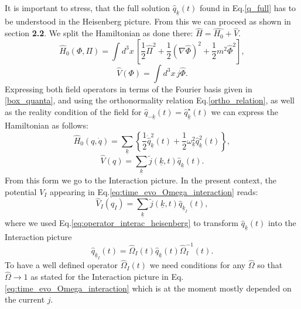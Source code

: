 \documentclass[12pt, titlepage]{article}
\begin{document}
It is important to stress, that the full solution $  \hat{q}_{\underline{k}}(t) 
 $ found in Eq.\enskip\eqref{q_full} has to be understood in the Heisenberg picture.
 From this we can proceed as shown in section \textbf{2.2}.  
We split the Hamiltonian as done there: $ \hat{H}= \hat{H_0} +\hat{V} $. 
\begin{equation}
\hat{H}_{0}({\Phi},{\Pi})=
\int d^{3}x 
\,
\left[ 
\frac{1}{2}\hat{\Pi}^{2} + \frac{1}{2}(\nabla \hat{ \Phi})^{2} 
+\frac{1}{2}m^{2}\hat{\Phi}^{2}
\right] 
,
\end{equation}
\begin{equation}
\hat{V}(\Phi)=
\int d^{3}x 
\,
j\hat{\Phi}
.
\end{equation}
Expressing both field operators in terms of the Fourier basis given in \eqref{box_quanta}, and using the orthonormality relation Eq.\enskip\eqref{ortho_relation}, as well as the reality condition of the field for $ \hat{q}_{-\underline{k}}(t)=\hat{q}^{\star}_{\underline{k}}(t) $ we can express the Hamiltonian as follows:
\begin{equation}
\hat{H}_{0}({q},\dot{{q}})=
\sum_{\underline{k}}
\left\lbrace 
\frac{1}{2}\dot{\hat{q}}^{2}_{\underline{k}}(t)
+\frac{1}{2}\omega_{\underline{k}}^{2}\hat{q}^{2}_{\underline{k}}(t)
\right\rbrace 
,
\end{equation}
\begin{equation}\label{V_heisenberg_with_q_and_j}
\hat{V}(q)=
\sum_{\underline{k}}
\tilde{j}(\underline{k},t)\hat{q}_{\underline{k}}(t).
\end{equation}
From this form we go to the Interaction picture. In the present context, the potential $ V_{I} $ appearing in Eq.\enskip\eqref{eq:time_evo_Omega_interaction} reads:
\begin{equation}\label{V_I_with_q_and_j}
\hat{V}_{I}(q_{I})=
\sum_{\underline{k}}
\tilde{j}(\underline{k},t)\hat{q}_{\underline{k}_{I}}(t),
\end{equation}
where we used Eq.\enskip\eqref{eq:operator_interac_heisenberg} to transform $ \hat{q}_{\underline{k}}(t) $ into the Interaction picture
\begin{equation}
\hat{q}_{\underline{k}_{I}}(t)=
\hat{\Omega}_{I}(t)
\hat{q}_{\underline{k}}(t)
\hat{\Omega}_{I}^{-1}(t).
\end{equation}
To have a well defined operator $ \hat{\Omega}_{I}(t) $  we need conditions for any $ \hat{\Omega} $ so that $\hat{\Omega} \rightarrow 1 $ as stated for the Interaction picture in Eq.\enskip\eqref{eq:time_evo_Omega_interaction} which is at the moment mostly depended on the current $ j $.
\end{document}
